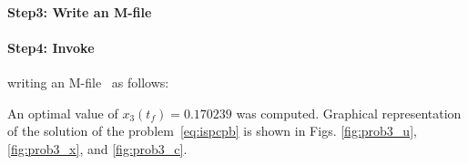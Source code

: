{\small }

\paragraph{Step3: Write an M-file~}

{\small }

\paragraph{Step4: Invoke~} writing an
M-file~ as follows: 

{\small }

An optimal value of $x_{3}(t_{f})=0.170239$ was computed. Graphical
representation of the solution of the problem~\eqref{eq:ispcpb} is
shown in Figs. \ref{fig:prob3_u}, \ref{fig:prob3_x}, and
\ref{fig:prob3_c}. 

